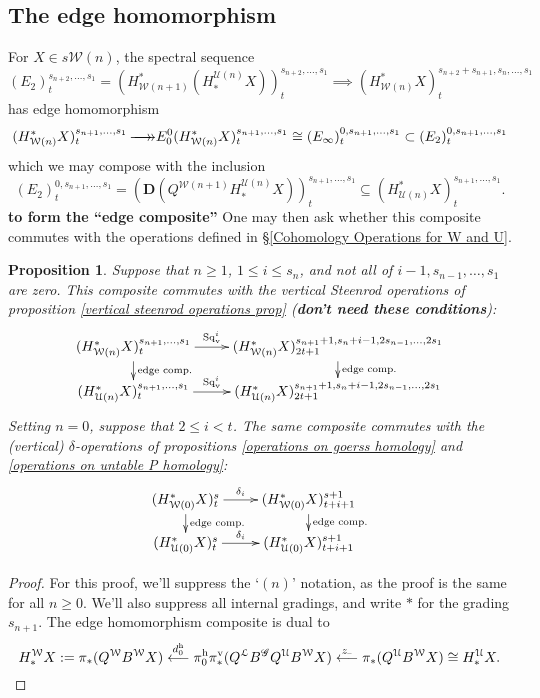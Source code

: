 \documentclass[11pt]{amsart}
\theoremstyle{plain}
\newtheorem{prop}[thm]{Proposition}
\theoremstyle{definition}
\newcommand{\DASH}{\textup{--}}
\renewcommand{\to}{\longrightarrow}
\newcommand{\from}{\longleftarrow}
\newcommand{\scrG}{\mathscr{G}}
\newcommand{\calW}{\mathcal{W}}
\newcommand{\calU}{\mathcal{U}}
\newcommand{\calL}{\mathcal{L}}
\theoremstyle{plain}
\newcommand{\BSW}{{\scrG}}
\newcommand{\epi}{{\,\makebox[0cm][l]{\ensuremath\to}\to}}
\newcommand{\Sqv}{\mathrm{Sq}_\textup{v}}
\newcommand{\dual}{\mathbf{D}}
\begin{document}
\begin{Composite functor spectral sequences}
\subsection{The edge homomorphism}
For $X\in s\calW(n)$, the spectral sequence
\[(E_2)^{s_{n+2},\ldots,s_1}_t=(H^*_{\calW(n+1)}(H_*^{\calU(n)}X))^{s_{n+2},\ldots,s_1}_t\implies (H^*_{\calW(n)}X)^{s_{n+2}+s_{n+1},s_n,\ldots,s_1}_t\]
has edge homomorphism
\[(H^*_{\calW(n)}X)^{s_{n+1},\ldots,s_{1}}_t\epi
E_0^{0}(H^*_{\calW(n)}X)^{s_{n+1},\ldots,s_{1}}_t\cong (E_\infty)^{0,s_{n+1},\ldots,s_1}_t\subset (E_2)^{0,s_{n+1},\ldots,s_1}_t\]
which we may compose with the inclusion
\[(E_2)^{0,s_{n+1},\ldots,s_1}_t=(\dual(Q^{\calW(n+1)}H_*^{\calU(n)}X))^{s_{n+1},\ldots,s_1}_t\subseteq (H^*_{\calU(n)}X)^{s_{n+1},\ldots,s_1}_t.\]
\textbf{to form the ``edge composite''}
One may then ask whether this composite commutes with the operations defined in \S\ref{Cohomology Operations for W and U}.
\begin{prop}\label{edgehomproposition}
Suppose that $n\geq1$, $1\leq i \leq s_n$, and not all of $i-1,s_{n-1},\ldots,s_1$ are zero. This composite commutes with the vertical Steenrod operations of proposition \ref{vertical steenrod operations prop} (\textbf{don't need these conditions}):
\[\xymatrix@R=4mm{
(H^*_{\calW(n)}X)^{s_{n+1},\ldots,s_1}_t\ar[r]^-{\Sqv^i}
\ar[d]^-{\textup{edge comp.}}
&%
(H^*_{\calW(n)}X)^{s_{n+1}+1,s_n+i-1,2s_{n-1},\ldots,2s_1}_{2t+1}\ar[d]^-{\textup{edge comp.}}
\\%
(H^*_{\calU(n)}X)^{s_{n+1},\ldots,s_1}_t\ar[r]^-{\Sqv^i}
&%
(H^*_{\calU(n)}X)^{s_{n+1}+1,s_n+i-1,2s_{n-1},\ldots,2s_1}_{2t+1}
}\]
Setting $n=0$, suppose that $2\leq i <t$. The same composite commutes with the (vertical) $\delta$-operations of propositions \ref{operations on goerss homology} and \ref{operations on untable P homology}:
\[\xymatrix@R=4mm{
(H^*_{\calW(0)}X)^{s}_t\ar[r]^-{\delta_i}
\ar[d]^-{\textup{edge comp.}}
&%
(H^*_{\calW(0)}X)^{s+1}_{t+i+1}\ar[d]^-{\textup{edge comp.}}
\\%
(H^*_{\calU(0)}X)^{s}_t\ar[r]^-{\delta_i}
&%
(H^*_{\calU(0)}X)^{s+1}_{t+i+1}
}\]
\end{prop}
\begin{proof}For this proof, we'll suppress the `$(n)$' notation, as the proof is the same for all $n\geq0$. We'll also suppress all internal gradings, and write $*$ for the grading $s_{n+1}$. The edge homomorphism composite is dual to
\[H_*^{\calW}X:=\pi_*(Q^{\calW}B^{\calW}X)\overset{d_0^\textup{h}}{\from}\pi_0^\textup{h}\pi_*^\textup{v}(Q^{\calL}B^{\BSW} Q^{\calU}B^{\calW}X)\overset{z_{\DASH}}{\from}\pi_*(Q^{\calU}B^{\calW}X)\cong H_*^{\calU}X.\]

\end{proof}
\end{Composite functor spectral sequences}
\end{document}
